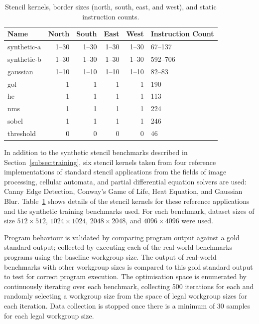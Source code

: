 \documentclass[nonatbib,preprint,10pt]{sigplanconf}
\begin{document}
\begin{table}
\scriptsize
\centering
\begin{tabular}{lrrrrp{1.3cm}}
\toprule
      Name &  North &  South &  East &  West &  Instruction Count \\
\midrule
   synthetic-a & 1--30 & 1--30 & 1--30 & 1--30 & 67--137\\
   synthetic-b & 1--30 & 1--30 & 1--30 & 1--30 & 592--706\\
   gaussian    & 1--10 & 1--10 & 1--10 & 1--10 & 82--83 \\
   gol         &      1 &      1 &     1 &     1 &                190 \\
   he          &      1 &      1 &     1 &     1 &                113 \\
   nms         &      1 &      1 &     1 &     1 &                224 \\
   sobel       &      1 &      1 &     1 &     1 &                246 \\
   threshold   &      0 &      0 &     0 &     0 &                 46 \\
\bottomrule
\end{tabular}
\caption{%
  Stencil kernels, border sizes (north, south, east, and west),
  and static instruction counts.
}
\label{tab:kernels}
\end{table}

In addition to the synthetic stencil benchmarks described in
Section~\ref{subsec:training}, six stencil kernels taken from four
reference implementations of standard stencil applications from the
fields of image processing, cellular automata, and partial
differential equation solvers are used: Canny Edge Detection, Conway's
Game of Life, Heat Equation, and Gaussian
Blur. Table~\ref{tab:kernels} shows details of the stencil kernels for
these reference applications and the synthetic training benchmarks
used. For each benchmark, dataset sizes of size $512\times512$,
$1024\times1024$, $2048\times2048$, and $4096\times4096$ were used.

Program behaviour is validated by comparing program output against a
gold standard output; collected by executing each of the real-world
benchmarks programs using the baseline workgroup size. The output of
real-world benchmarks with other workgroup sizes is compared to this
gold standard output to test for correct program execution. The
optimisation space is enumerated by continuously iterating over each
benchmark, collecting 500 iterations for each and randomly selecting a
workgroup size from the space of legal workgroup sizes for each
iteration. Data collection is stopped once there is a minimum of 30
samples for each legal workgroup size.
\end{document}
